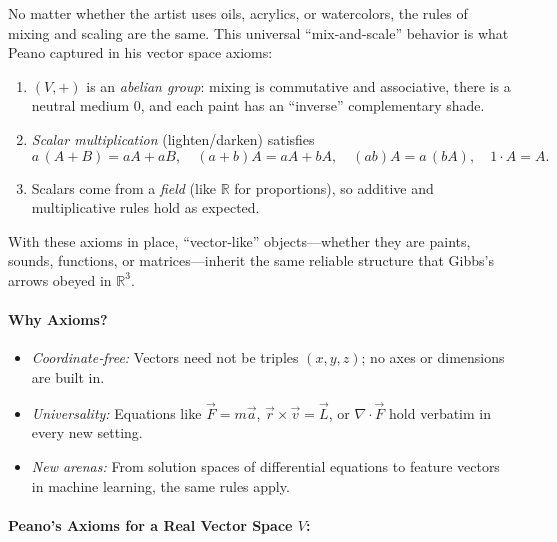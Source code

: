 No matter whether the artist uses oils, acrylics, or watercolors, the rules of mixing and scaling are the same.  This universal “mix-and-scale” behavior is what Peano captured in his vector space axioms:

\begin{enumerate}
  \item \((V,+)\) is an \emph{abelian group}: mixing is commutative and associative, there is a neutral medium \(0\), and each paint has an “inverse” complementary shade.
  \item \emph{Scalar multiplication} (lighten/darken) satisfies
    \[
      a\,(A+B)=aA+aB,\quad
      (a+b)A = aA+bA,\quad
      (ab)A = a\,(bA),\quad
      1\cdot A = A.
    \]
  \item Scalars come from a \emph{field} (like \(\mathbb R\) for proportions), so additive and multiplicative rules hold as expected.
\end{enumerate}

With these axioms in place, “vector‐like” objects—whether they are paints, sounds, functions, or matrices—inherit the same reliable structure that Gibbs’s arrows obeyed in \(\mathbb R^3\).  


\paragraph{Why Axioms?}

\begin{itemize}
  \item \emph{Coordinate‐free:}  Vectors need not be triples \((x,y,z)\); no axes or dimensions are built in.
  \item \emph{Universality:}  Equations like \(\vec F=m\vec a\), \(\vec r\times\vec v=\vec L\), or \(\nabla\!\cdot\vec F\) hold verbatim in every new setting.
  \item \emph{New arenas:}  From solution spaces of differential equations to feature vectors in machine learning, the same rules apply.
\end{itemize}

\paragraph{Peano’s Axioms for a Real Vector Space \(V\):}

